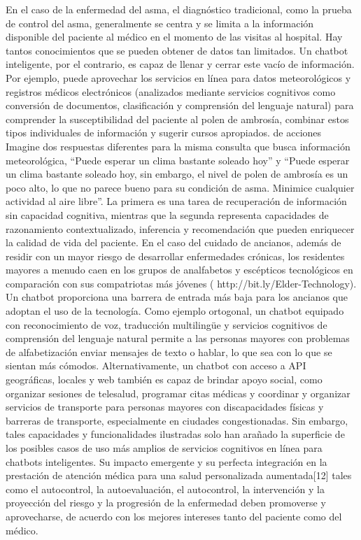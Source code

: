 En el caso de la enfermedad del asma, el diagnóstico tradicional, como la prueba de control del asma, generalmente se centra y se limita a la información disponible del paciente al médico en el momento de las visitas al hospital. Hay tantos conocimientos que se pueden obtener de datos tan limitados. Un chatbot inteligente, por el contrario, es capaz de llenar y cerrar este vacío de información. Por ejemplo, puede aprovechar los servicios en línea para datos meteorológicos y registros médicos electrónicos (analizados mediante servicios cognitivos como conversión de documentos, clasificación y comprensión del lenguaje natural) para comprender la susceptibilidad del paciente al polen de ambrosía, combinar estos tipos individuales de información y sugerir cursos apropiados. de acciones Imagine dos respuestas diferentes para la misma consulta que busca información meteorológica, “Puede esperar un clima bastante soleado hoy” y “Puede esperar un clima bastante soleado hoy, sin embargo, el nivel de polen de ambrosía es un poco alto, lo que no parece bueno para su condición de asma. Minimice cualquier actividad al aire libre”. La primera es una tarea de recuperación de información sin capacidad cognitiva, mientras que la segunda representa capacidades de razonamiento contextualizado, inferencia y recomendación que pueden enriquecer la calidad de vida del paciente.
En el caso del cuidado de ancianos, además de residir con un mayor riesgo de desarrollar enfermedades crónicas, los residentes mayores a menudo caen en los grupos de analfabetos y escépticos tecnológicos en comparación con sus compatriotas más jóvenes ( http://bit.ly/Elder-Technology). Un chatbot proporciona una barrera de entrada más baja para los ancianos que adoptan el uso de la tecnología. Como ejemplo ortogonal, un chatbot equipado con reconocimiento de voz, traducción multilingüe y servicios cognitivos de comprensión del lenguaje natural permite a las personas mayores con problemas de alfabetización enviar mensajes de texto o hablar, lo que sea con lo que se sientan más cómodos. Alternativamente, un chatbot con acceso a API geográficas, locales y web también es capaz de brindar apoyo social, como organizar sesiones de telesalud, programar citas médicas y coordinar y organizar servicios de transporte para personas mayores con discapacidades físicas y barreras de transporte, especialmente en ciudades congestionadas. Sin embargo, tales capacidades y funcionalidades ilustradas solo han arañado la superficie de los posibles casos de uso más amplios de servicios cognitivos en línea para chatbots inteligentes. Su impacto emergente y su perfecta integración en la prestación de atención médica para una salud personalizada aumentada[12] tales como el autocontrol, la autoevaluación, el autocontrol, la intervención y la proyección del riesgo y la progresión de la enfermedad deben promoverse y aprovecharse, de acuerdo con los mejores intereses tanto del paciente como del médico.


